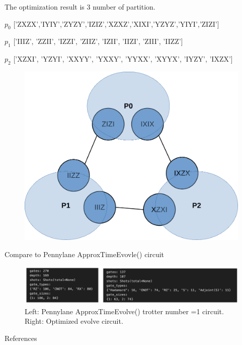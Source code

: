 \documentclass[
11pt,notheorems,hyperref={pdfauthor=Hyunseong Kim}
]{beamer}
\begin{document}
\begin{frame}
    The optimization result is 3 number of partition.

    $p_0$
    ['ZXZX','IYIY','ZYZY','IZIZ','XZXZ','XIXI','YZYZ','YIYI','ZIZI']
    
    $p_1$
    ['IIIZ', 'ZZII', 'IZZI', 'ZIIZ', 'IZII', 'IIZI', 'ZIII', 'IIZZ']

    $p_2$
    ['XZXI', 'YZYI', 'XXYY', 'YXXY', 'YYXX', 'XYYX', 'IYZY', 'IXZX']

\end{frame}

\begin{frame}
    \begin{figure}
        \includegraphics[scale=0.45]{ppp.pdf}
    \end{figure}
\end{frame}

\begin{frame}
    Compare to Pennylane ApproxTimeEvovle() circuit

    \begin{figure}
        \includegraphics[scale=0.55]{compare.png}
        \caption{Left: Pennylane ApproxTimeEvolve() trotter number =1 circuit. Right: Optimized evolve circuit.}
    \end{figure}
\end{frame}


\begin{frame}[allowframebreaks]{References}
    \printbibliography
\end{frame}
\end{document}
